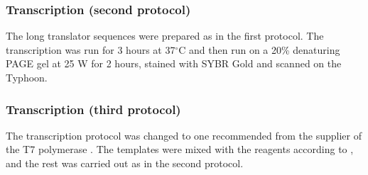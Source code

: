 %
%

\subsubsection{Transcription (second protocol)}

The long translator sequences were prepared as in the first protocol. The transcription was run for 3 hours at 37$^\circ$C and then run on a 20\% denaturing PAGE gel at 25 W for 2 hours, stained with SYBR Gold and scanned on the Typhoon.

\subsubsection{Transcription (third protocol)}

The transcription protocol was changed to one recommended from the supplier of the T7 polymerase \cite{nebtranscription}. The templates were mixed with the reagents according to , and the rest was carried out as in the second protocol.



